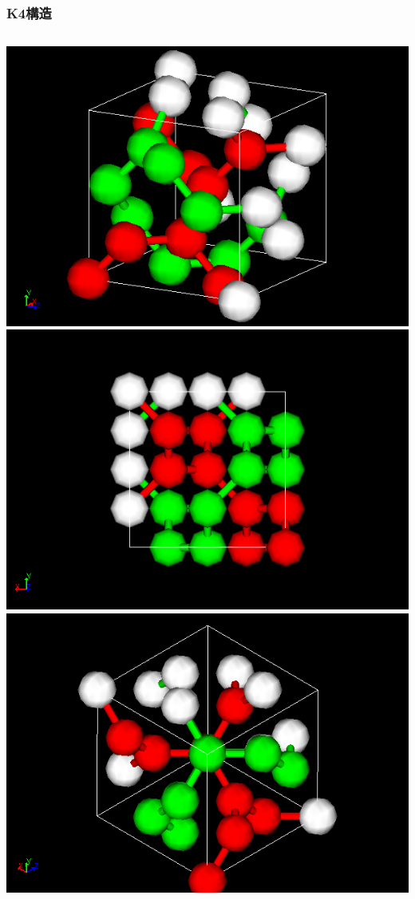 \documentclass[11pt, dvipdfmx]{beamer}
\begin{document}
\begin{frame}
\frametitle{K4構造}
\begin{columns}[T, totalwidth=\linewidth]
\centering
\includegraphics[width=\columnwidth]{./fig/K4_d.png}
\centering
\includegraphics[width=\columnwidth]{./fig/K4_d_2.png}
\centering
\includegraphics[width=\columnwidth]{./fig/K4_d_3.png}
\end{columns}
\end{frame}
\end{document}
